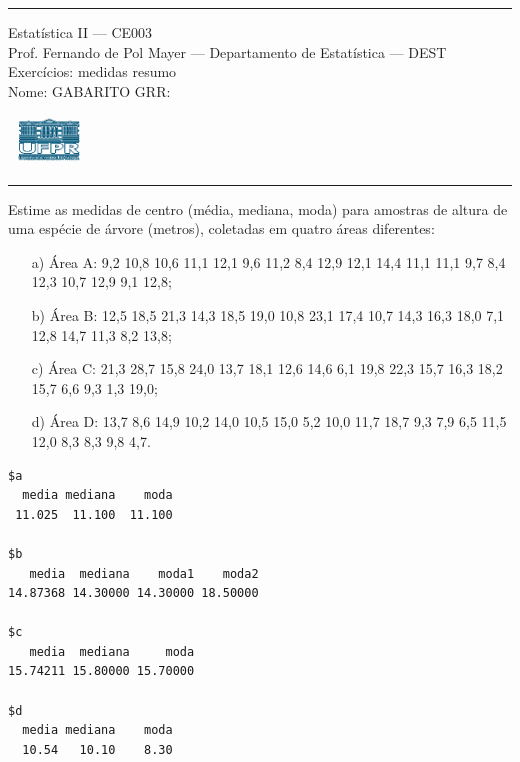 \documentclass[a4paper,11pt,fleqn]{article}\usepackage[]{graphicx}\usepackage[]{color}
\makeatletter
\newenvironment{kframe}{%
 \def\at@end@of@kframe{}%
 \ifinner\ifhmode%
  \def\at@end@of@kframe{\end{minipage}}%
  \begin{minipage}{\columnwidth}%
 \fi\fi%
 \def\FrameCommand##1{\hskip\@totalleftmargin \hskip-\fboxsep
 \colorbox{shadecolor}{##1}\hskip-\fboxsep
     \hskip-\linewidth \hskip-\@totalleftmargin \hskip\columnwidth}%
 \MakeFramed {\advance\hsize-\width
   \@totalleftmargin\z@ \linewidth\hsize
   \@setminipage}}%
 {\par\unskip\endMakeFramed%
 \at@end@of@kframe}
\newenvironment{knitrout}{}{} %
\theoremstyle{definition}
\makeatother
\begin{document}
\reversemarginpar %





\hrule
\vspace{0.3cm}

\begin{minipage}[c]{.85\textwidth}
  Estatística II --- CE003 \\
  Prof. Fernando de Pol Mayer --- Departamento de Estatística --- DEST \\
  Exercícios: medidas resumo \\
  Nome: GABARITO  \hfill GRR: \hspace{2cm}
\end{minipage}\hfill
\begin{minipage}[c]{.15\textwidth}
\flushright
\includegraphics[width=2.2cm]{../img/ufpr-logo.png}
\end{minipage}

\vspace{0.3cm}
\hrule
\vspace{0.3cm}

\begin{compactenum}[1.]
\item Estime as medidas de centro (média, mediana,
  moda) para amostras de altura de uma espécie de árvore (metros),
  coletadas em quatro áreas diferentes:
  \begin{itemize}
  \item[a)] Área A: 9,2 10,8 10,6 11,1 12,1 9,6 11,2 8,4 12,9 12,1
    14,4 11,1 11,1 9,7 8,4 12,3 10,7 12,9 9,1 12,8;
  \item[b)] Área B: 12,5 18,5 21,3 14,3 18,5 19,0 10,8 23,1 17,4 10,7
    14,3 16,3 18,0 7,1 12,8 14,7 11,3 8,2 13,8;
  \item[c)] Área C: 21,3 28,7 15,8 24,0 13,7 18,1 12,6 14,6 6,1 19,8
    22,3 15,7 16,3 18,2 15,7 6,6 9,3 1,3 19,0;
  \item[d)] Área D: 13,7 8,6 14,9 10,2 14,0 10,5 15,0 5,2 10,0 11,7
    18,7 9,3 7,9 6,5 11,5 12,0 8,3 8,3 9,8 4,7.
  \end{itemize}
\begin{knitrout}\small
{}\color{fgcolor}\begin{kframe}
\begin{verbatim}
$a
  media mediana    moda 
 11.025  11.100  11.100 

$b
   media  mediana    moda1    moda2 
14.87368 14.30000 14.30000 18.50000 

$c
   media  mediana     moda 
15.74211 15.80000 15.70000 

$d
  media mediana    moda 
  10.54   10.10    8.30 
\end{verbatim}
\end{kframe}
\end{knitrout}
\end{compactenum}
\end{document}
